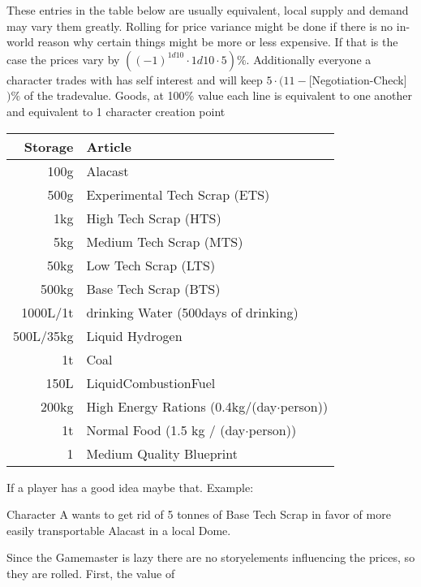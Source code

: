 \documentclass{article}
\begin{document}
    These entries in the table below are usually equivalent, local supply and demand may vary them greatly.
    Rolling for price variance might be done if there is no in-world reason why certain things might be more or
    less expensive. If that is the case the prices vary by \(((-1)^{1d10}\cdot1d10\cdot5) \%\).
    Additionally everyone a character trades with has self interest and will keep \(5\cdot(11-\)[Negotiation-Check]\()\%\) of
    the tradevalue.\newline \newline
    Goods, at 100\% value each line is equivalent to one another and equivalent to 1 character creation point \par
    \begin{tabular}{r|l}
        Storage & Article\\\hline
        100g & Alacast\\\hline
        500g & Experimental Tech Scrap (ETS)\\\hline
        1kg & High Tech Scrap (HTS)\\\hline
        5kg & Medium Tech Scrap (MTS)\\\hline
        50kg & Low Tech Scrap (LTS)\\\hline
        500kg & Base Tech Scrap (BTS)\\\hline
        1000L/1t & drinking Water (500days of drinking)\\\hline
        500L/35kg & Liquid Hydrogen\\\hline
        1t & Coal\\\hline
        150L & LiquidCombustionFuel\\\hline
        200kg & High Energy Rations (0.4kg/(day\(\cdot\)person))\\\hline
        1t & Normal Food (1.5 kg / (day\(\cdot\)person))\\\hline
        1 & Medium Quality Blueprint\\\hline

    \end{tabular}\par
    If a player has a good idea maybe that.\newline
    \newline
    Example:\par
    Character A wants to get rid of 5 tonnes of Base Tech Scrap in favor of more easily transportable Alacast in a local
    Dome.\par
    Since the Gamemaster is lazy there are no storyelements influencing the prices, so they are rolled. First, the value of
\end{document}
